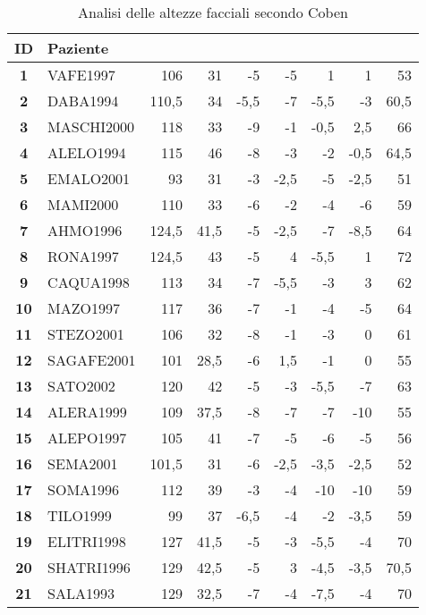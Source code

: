 \begin{landscape}
\begin{table}[p]
\footnotesize
\centering
\caption{Analisi delle altezze facciali secondo Coben}
\begin{tabular}{>{\bfseries}cl*{7}{D{,}{,}{-1}}}
\toprule
ID & Paziente &  &  &  &  &  &  &  \\
 & VAFE1997 & 106 & 31 & -5 & -5 & 1 & 1 & 53 \\
2 & DABA1994 & 110,5 & 34 & -5,5 & -7 & -5,5 & -3 & 60,5 \\
3 & MASCHI2000 & 118 & 33 & -9 & -1 & -0,5 & 2,5 & 66 \\
4 & ALELO1994 & 115 & 46 & -8 & -3 & -2 & -0,5 & 64,5 \\
5 & EMALO2001 & 93 & 31 & -3 & -2,5 & -5 & -2,5 & 51 \\
6 & MAMI2000 & 110 & 33 & -6 & -2 & -4 & -6 & 59 \\
7 & AHMO1996 & 124,5 & 41,5 & -5 & -2,5 & -7 & -8,5 & 64 \\
8 & RONA1997 & 124,5 & 43 & -5 & 4 & -5,5 & 1 & 72 \\
9 & CAQUA1998 & 113 & 34 & -7 & -5,5 & -3 & 3 & 62 \\
10 & MAZO1997 & 117 & 36 & -7 & -1 & -4 & -5 & 64 \\
11 & STEZO2001 & 106 & 32 & -8 & -1 & -3 & 0 & 61 \\
12 & SAGAFE2001 & 101 & 28,5 & -6 & 1,5 & -1 & 0 & 55 \\
13 & SATO2002 & 120 & 42 & -5 & -3 & -5,5 & -7 & 63 \\
14 & ALERA1999 & 109 & 37,5 & -8 & -7 & -7 & -10 & 55 \\
15 & ALEPO1997 & 105 & 41 & -7 & -5 & -6 & -5 & 56 \\
16 & SEMA2001 & 101,5 & 31 & -6 & -2,5 & -3,5 & -2,5 & 52 \\
17 & SOMA1996 & 112 & 39 & -3 & -4 & -10 & -10 & 59 \\
18 & TILO1999 & 99 & 37 & -6,5 & -4 & -2 & -3,5 & 59 \\
19 & ELITRI1998 & 127 & 41,5 & -5 & -3 & -5,5 & -4 & 70 \\
20 & SHATRI1996 & 129 & 42,5 & -5 & 3 & -4,5 & -3,5 & 70,5 \\
21 & SALA1993 & 129 & 32,5 & -7 & -4 & -7,5 & -4 & 70 \\

\end{tabular}
\end{table}
\end{landscape}
